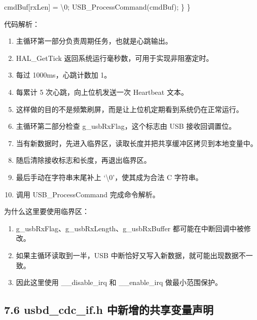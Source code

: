 \documentclass[
  chinese,
  UTF8,
  oneside,
  openany]{ctexbook}
\newenvironment{Shaded}{}{}
\newcommand{\CharTok}[1]{\textcolor[rgb]{0.25,0.44,0.63}{#1}}
\newcommand{\NormalTok}[1]{#1}
\newcommand{\OperatorTok}[1]{\textcolor[rgb]{0.40,0.40,0.40}{#1}}
\newcommand{\SpecialCharTok}[1]{\textcolor[rgb]{0.25,0.44,0.63}{#1}}
\providecommand{\tightlist}{%
  \setlength{\itemsep}{0pt}\setlength{\parskip}{0pt}}
\begin{document}
\begin{Shaded}
\begin{Highlighting}[]
\NormalTok{        cmdBuf}\OperatorTok{[}\NormalTok{rxLen}\OperatorTok{]} \OperatorTok{=} \CharTok{\textquotesingle{}}\SpecialCharTok{\textbackslash{}0}\CharTok{\textquotesingle{}}\OperatorTok{;}
\NormalTok{        USB\_ProcessCommand}\OperatorTok{(}\NormalTok{cmdBuf}\OperatorTok{);}
    \OperatorTok{\}}
\OperatorTok{\}}
\end{Highlighting}
\end{Shaded}

代码解析：

\begin{enumerate}
\def\labelenumi{\arabic{enumi}.}
\tightlist
\item
  主循环第一部分负责周期任务，也就是心跳输出。
\item
  HAL\_GetTick 返回系统运行毫秒数，可用于实现非阻塞定时。
\item
  每过 1000ms，心跳计数加 1。
\item
  每累计 5 次心跳，向上位机发送一次 Heartbeat 文本。
\item
  这样做的目的不是频繁刷屏，而是让上位机定期看到系统仍在正常运行。
\item
  主循环第二部分检查 g\_usbRxFlag，这个标志由 USB 接收回调置位。
\item
  当有新数据时，先进入临界区，读取长度并把共享缓冲区拷贝到本地变量中。
\item
  随后清除接收标志和长度，再退出临界区。
\item
  最后手动在字符串末尾补上 `\textbackslash0'，使其成为合法 C 字符串。
\item
  调用 USB\_ProcessCommand 完成命令解析。
\end{enumerate}

为什么这里要使用临界区：

\begin{enumerate}
\def\labelenumi{\arabic{enumi}.}
\tightlist
\item
  g\_usbRxFlag、g\_usbRxLength、g\_usbRxBuffer
  都可能在中断回调中被修改。
\item
  如果主循环读取到一半，USB 中断恰好又写入新数据，就可能出现数据不一致。
\item
  因此这里使用 \_\_disable\_irq 和 \_\_enable\_irq 做最小范围保护。
\end{enumerate}

\subsection{7.6 usbd\_cdc\_if.h
中新增的共享变量声明}\label{usbd_cdc_if.h-ux4e2dux65b0ux589eux7684ux5171ux4eabux53d8ux91cfux58f0ux660e}
\end{document}
